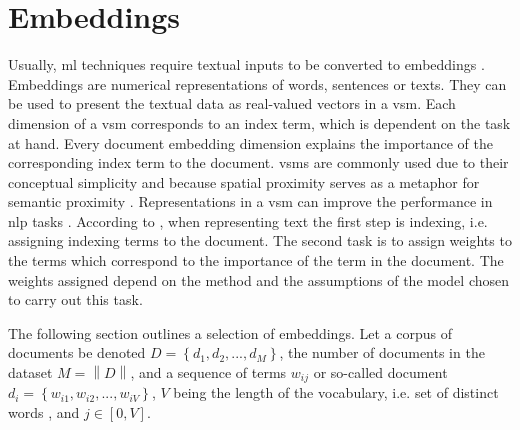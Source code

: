 \section{Embeddings}\label{sec:embeddings}

Usually, \ac{ml} techniques require textual inputs to be converted to embeddings \cite{SentRep2014}.
Embeddings are numerical representations of words, sentences or texts.
They can be used to present the textual data as real-valued vectors in a \ac{vsm}.
Each dimension of a \ac{vsm} corresponds to an index term, which is dependent on the task at hand.
Every document embedding dimension explains the importance of the corresponding index term to the document.
\acp{vsm} are commonly used due to their conceptual simplicity and because spatial proximity serves as a metaphor for semantic proximity 
\cite{tfidf2008, UniversalSentEnc2018, HfsentTrans2019, Top2Vec2020}.
Representations in a \ac{vsm} can improve the performance in \ac{nlp} tasks \cite{SkipGram2013}.
According to \citeauthor{tfidf2008}, when representing text the first step is indexing, i.e. assigning indexing terms to the document.
The second task is to assign weights to the terms which correspond to the importance of the term in the document.
The weights assigned depend on the method and the assumptions of the model chosen to carry out this task.

The following section outlines a selection of embeddings.
Let a corpus of documents be denoted $D= \left\{d_1, d_2, ..., d_M  \right\}$, 
the number of documents in the dataset $M = \left\| D \right\|$,
and a sequence of terms $w_{ij}$ or so-called document $d_i = \left\{w_{i1}, w_{i2}, ..., w_{iV}  \right\}$, 
$V$ being the length of the vocabulary, 
i.e. set of distinct words \cite{clusteringDocs2020}, and $j \in [0, V]$.










